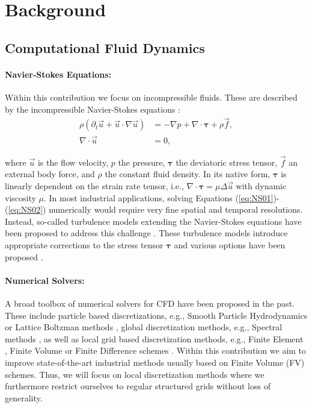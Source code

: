 \section{Background}

\subsection{Computational Fluid Dynamics}\label{sec:CFD}

\paragraph{Navier-Stokes Equations:} 
Within this contribution we focus on incompressible fluids. These are described by the incompressible Navier-Stokes equations \cite{acheson1990elementary}:
{\footnotesize
\begin{align}
    \rho \left(\partial_t \vec{u} + \vec{u} \cdot \nabla \vec{u} \right) &=
       - \nabla p + \nabla \cdot \bm{\tau} + \rho \vec{f}, \label{eq:NS01}\\
    \nabla \cdot \vec{u} &= 0,   \label{eq:NS02}
\end{align}}

\noindent
where $\vec{u}$ is the flow velocity, $p$ the pressure, $\bm{\tau}$ the deviatoric stress tensor, $\vec{f}$ an external body force, and $\rho$ the constant fluid density. In its native form, $\bm{\tau}$ is linearly dependent on the strain rate tensor, i.e.,  $\nabla \cdot \bm{\tau} = \mu \Delta \vec{u}$ with dynamic viscosity $\mu$. In most industrial applications, solving Equations (\ref{eq:NS01})-(\ref{eq:NS02}) numerically would require very fine spatial and temporal resolutions. Instead, so-called turbulence models extending the Navier-Stokes equations have been proposed to address this challenge \cite{pope2000turbulent}. These turbulence models introduce appropriate corrections to the stress tensor $\bm{\tau}$ and various options have been proposed \cite{pope2000turbulent}.  

\paragraph{Numerical Solvers:}
A broad toolbox of numerical solvers for CFD have been proposed \cite{Kelsall2022CFD} in the past. These include particle based discretizations, e.g., Smooth Particle Hydrodynamics \cite{onate2011particle} or Lattice Boltzman methods \cite{kruger2017lattice}, global discretization methods, e.g., Spectral methods \cite{shen2011spectral}, as well as local grid based discretization methods, e.g., Finite Element \cite{turek1999efficient}, Finite Volume \cite{moukalled2016finite} or Finite Difference schemes \cite{griebel1998numerical}. Within this contribution we aim to improve state-of-the-art industrial methods usually based on Finite Volume (FV) schemes. Thus, we will focus on local discretization methods where we furthermore restrict ourselves to regular structured grids without loss of generality.

